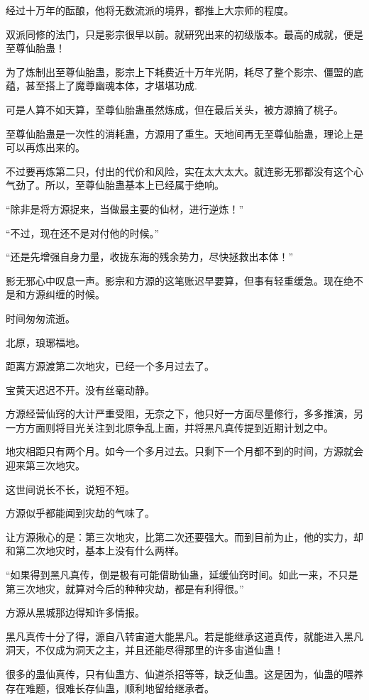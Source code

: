 \begin{this_body}
经过十万年的酝酿，他将无数流派的境界，都推上大宗师的程度。

双派同修的法门，只是影宗很早以前。就研究出来的初级版本。最高的成就，便是至尊仙胎蛊！

为了炼制出至尊仙胎蛊，影宗上下耗费近十万年光阴，耗尽了整个影宗、僵盟的底蕴，甚至搭上了魔尊幽魂本体，才堪堪功成.

可是人算不如天算，至尊仙胎蛊虽然炼成，但在最后关头，被方源摘了桃子。

至尊仙胎蛊是一次性的消耗蛊，方源用了重生。天地间再无至尊仙胎蛊，理论上是可以再炼出来的。

不过要再炼第二只，付出的代价和风险，实在太大太大。就连影无邪都没有这个心气劲了。所以，至尊仙胎蛊基本上已经属于绝响。

“除非是将方源捉来，当做最主要的仙材，进行逆炼！”

“不过，现在还不是对付他的时候。”

“还是先增强自身力量，收拢东海的残余势力，尽快拯救出本体！”

影无邪心中叹息一声。影宗和方源的这笔账迟早要算，但事有轻重缓急。现在绝不是和方源纠缠的时候。

时间匆匆流逝。

北原，琅琊福地。

距离方源渡第二次地灾，已经一个多月过去了。

宝黄天迟迟不开。没有丝毫动静。

方源经营仙窍的大计严重受阻，无奈之下，他只好一方面尽量修行，多多推演，另一方方面则将目光关注到北原争乱上面，并将黑凡真传提到近期计划之中。

地灾相距只有两个月。如今一个多月过去。只剩下一个月都不到的时间，方源就会迎来第三次地灾。

这世间说长不长，说短不短。

方源似乎都能闻到灾劫的气味了。

让方源揪心的是：第三次地灾，比第二次还要强大。而到目前为止，他的实力，却和第二次地灾时，基本上没有什么两样。

“如果得到黑凡真传，倒是极有可能借助仙蛊，延缓仙窍时间。如此一来，不只是第三次地灾，就算对今后的种种灾劫，都是有利得很。”

方源从黑城那边得知许多情报。

黑凡真传十分了得，源自八转宙道大能黑凡。若是能继承这道真传，就能进入黑凡洞天，不仅成为洞天之主，并且还能尽得那里的许多宙道仙蛊！

很多的蛊仙真传，只有仙蛊方、仙道杀招等等，缺乏仙蛊。这是因为，仙蛊的喂养存在难题，很难长存仙蛊，顺利地留给继承者。


\end{this_body}
